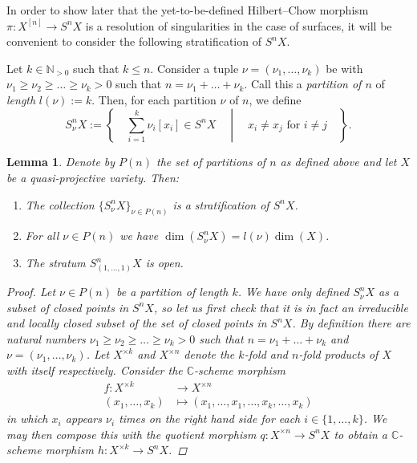 \documentclass[12pt,a4paper]{amsart}
\theoremstyle{plain}
\newtheorem{lm}[thm]{Lemma}
\theoremstyle{definition}
\theoremstyle{remark}
\begin{document}
In order to show later that the yet-to-be-defined Hilbert--Chow morphism $\pi \colon X^{[n]} \to S^{n}X$ is a resolution of singularities in the case of surfaces, it will be convenient to consider the following stratification of $S^{n}X$.

Let $k \in \mathbb{N}_{>0}$ such that $k \leq n$.
Consider a tuple $\nu = (\nu_{1}, \ldots, \nu_{k})$ be with $\nu_{1} \geq \nu_{2} \geq \ldots \geq \nu_{k} > 0$ such that $n = \nu_{1} + \ldots + \nu_{k}$.
Call this a \textit{partition of $n$} of \textit{length} $l(\nu) := k$.
Then, for each partition $\nu$ of $n$, we define
\[ S^{n}_{\nu}X := \left\{ \quad \sum_{i = 1}^{k} \nu_{i}[x_{i}] \in S^{n}X \quad \middle| \quad x_{i} \neq x_{j} \text{ for } i \neq j \quad \right\}. \]

\begin{lm}\label{lm:stratification}
  Denote by $P(n)$ the set of partitions of $n$ as defined above and let $X$ be a quasi-projective variety.
  Then:
  \begin{enumerate}[label=(\roman*)]
    \item The collection $\{ S_{\nu}^{n}X \}_{\nu \in P(n)}$ is a stratification of $S^{n}X$.
    \item For all $\nu \in P(n)$ we have $\dim(S_{\nu}^{n}X) = l(\nu)\dim(X)$.
    \item The stratum $S_{(1,\ldots,1)}^{n}X$ is open.
  \end{enumerate} 
  \begin{proof}
    Let $\nu \in P(n)$ be a partition of length $k$.
    We have only defined $S^{n}_{\nu}X$ as a subset of closed points in $S^{n}X$, so let us first check that it is in fact an irreducible and locally closed subset of the set of closed points in $S^{n}X$.
    By definition there are natural numbers $\nu_{1} \geq \nu_{2} \geq \ldots \geq \nu_{k} > 0$ such that $n = \nu_{1} + \ldots + \nu_{k}$ and $\nu = (\nu_{1},\ldots, \nu_{k})$.
    Let $X^{\times k}$ and $X^{\times n}$ denote the $k$-fold and $n$-fold products of $X$ with itself respectively.
    Consider the $\mathbb{C}$-scheme morphism
    \begin{align*}
      f \colon X^{\times k} & \longrightarrow X^{\times n} \\
      (x_{1}, \ldots, x_{k}) & \longmapsto (x_{1}, \ldots, x_{1}, \ldots, x_{k}, \ldots, x_{k})
    \end{align*}
    in which $x_{i}$ appears $\nu_{i}$ times on the right hand side for each $i \in \{1, \ldots, k \}$.
    We may then compose this with the quotient morphism $q \colon X^{\times n} \to S^{n}X$ to obtain a $\mathbb{C}$-scheme morphism $h \colon X^{\times k} \to S^{n}X$.

\end{proof}
\end{lm}
\end{document}
